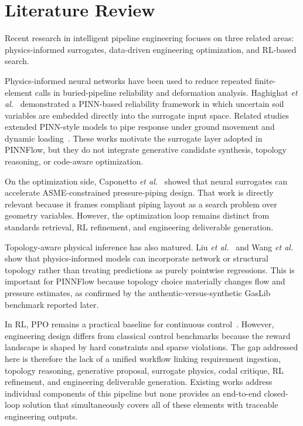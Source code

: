 \documentclass[conference]{IEEEtran}
\begin{document}
\section{Literature Review}


Recent research in intelligent pipeline engineering focuses on three related areas: physics-informed surrogates, data-driven engineering optimization, and RL-based search.
 
Physics-informed neural networks have been used to reduce repeated finite-element calls in buried-pipeline reliability and deformation analysis. Haghighat \textit{et al.}~\cite{haghighat2025} demonstrated a PINN-based reliability framework in which uncertain soil variables are embedded directly into the surrogate input space. Related studies extended PINN-style models to pipe response under ground movement and dynamic loading~\cite{chen2025,patel2025}. These works motivate the surrogate layer adopted in PINNFlow, but they do not integrate generative candidate synthesis, topology reasoning, or code-aware optimization.
 
On the optimization side, Caponetto \textit{et al.}~\cite{caponetto2022} showed that neural surrogates can accelerate ASME-constrained pressure-piping design. That work is directly relevant because it frames compliant piping layout as a search problem over geometry variables. However, the optimization loop remains distinct from standards retrieval, RL refinement, and engineering deliverable generation.
 
Topology-aware physical inference has also matured. Liu \textit{et al.}~\cite{liu2025} and Wang \textit{et al.}~\cite{wang2024} show that physics-informed models can incorporate network or structural topology rather than treating predictions as purely pointwise regressions. This is important for PINNFlow because topology choice materially changes flow and pressure estimates, as confirmed by the authentic-versus-synthetic GasLib benchmark reported later.
 
In RL, PPO remains a practical baseline for continuous control~\cite{schulman2017,sutton2018}. However, engineering design differs from classical control benchmarks because the reward landscape is shaped by hard constraints and sparse violations. The gap addressed here is therefore the lack of a unified workflow linking requirement ingestion, topology reasoning, generative proposal, surrogate physics, codal critique, RL refinement, and engineering deliverable generation. Existing works address individual components of this pipeline but none provides an end-to-end closed-loop solution that simultaneously covers all of these elements with traceable engineering outputs.
 
\end{document}
